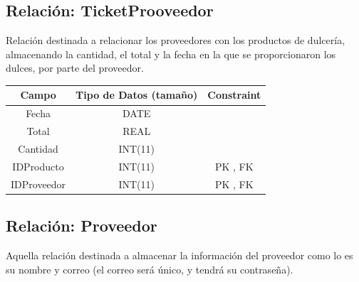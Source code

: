\documentclass[12pt, fleqn]{report}                             %
\begin{document}
        \clearpage
        \subsection*{Relación: TicketProoveedor}

            Relación destinada a relacionar los proveedores con los productos de dulcería,
            almacenando la cantidad, el total y la fecha en la que se proporcionaron los dulces,
            por parte del proveedor.

            \vspace{2em}

            \small{
            \begin{tabular}{| c | c | c |}
                \hline
                \textbf{Campo} & \textbf{Tipo de Datos (tamaño)} & \textbf{Constraint} \\[0.5ex] 
                \hline\hline
                
                Fecha       & DATE          &                       \\
                Total       & REAL          &                       \\
                Cantidad    & INT(11)       &                       \\
                IDProducto  & INT(11)       & PK , FK               \\
                IDProveedor & INT(11)       & PK , FK               \\
                \hline
            \end{tabular}
            }

        \subsection*{Relación: Proveedor}

            Aquella relación destinada a almacenar la información del proveedor como
            lo es su nombre y correo (el correo será único, y tendrá su contraseña).

            \vspace{2em}
\end{document}
